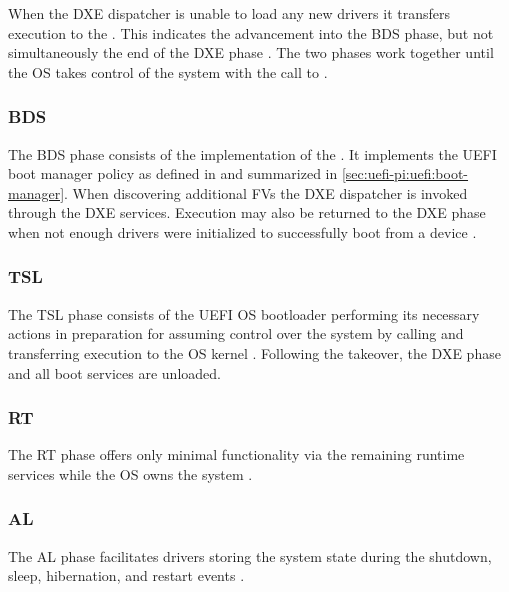 When the \ac{DXE} dispatcher is unable to load any new drivers it transfers execution to the  \cite[Vol. 2, 2.4]{pi-spec}.
This indicates the advancement into the \ac{BDS} phase, but not simultaneously the end of the \ac{DXE} phase \cite[Vol. 2, 2.1]{pi-spec}.
The two phases work together until the \ac{OS} takes control of the system with the call to .

\subsubsection{\acf{BDS}}

The \ac{BDS} phase consists of the implementation of the .
It implements the \ac{UEFI} boot manager policy as defined in \cite[Section 3]{uefi-spec} and summarized in \autoref{sec:uefi-pi:uefi:boot-manager}.
When discovering additional \acp{FV} the \ac{DXE} dispatcher is invoked through the \ac{DXE} services.
Execution may also be returned to the \ac{DXE} phase when not enough drivers were initialized to successfully boot from a device \cite[Vol. 2, 12.2]{pi-spec}.


\subsubsection{\acf{TSL}}

The \ac{TSL} phase consists of the \ac{UEFI} \ac{OS} bootloader performing its necessary actions in preparation for assuming control over the system by calling  and transferring execution to the \ac{OS} kernel \cite[Section 2.3]{tianocore-edk2-build-spec}.
Following the takeover, the \ac{DXE} phase and all boot services are unloaded.

\subsubsection{\acf{RT}}

The \ac{RT} phase offers only minimal functionality via the remaining runtime services while the \ac{OS} owns the system \cite[Section 2.3]{tianocore-edk2-build-spec}.

\subsubsection{\acf{AL}}

The \ac{AL} phase facilitates drivers storing the system state during the shutdown, sleep, hibernation, and restart events \cite[Section 2.3]{tianocore-edk2-build-spec}.
